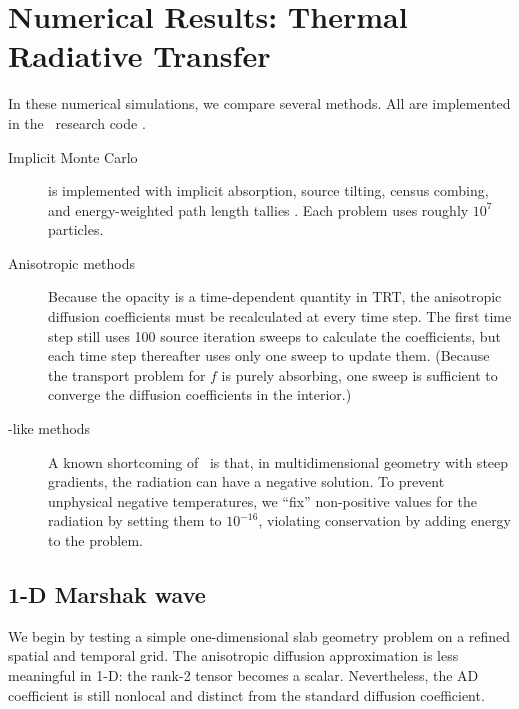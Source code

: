 
\chapter{Numerical Results: Thermal Radiative Transfer}
\label{chap:trtNumericalResults}

In these numerical simulations, we compare several methods. All
are implemented in the \pytrt\ research code \cite{Pytrt}.

\begin{description}

  \item[Implicit Monte Carlo] is implemented  with implicit
    absorption, source tilting, census combing, and
    energy-weighted path length tallies \cite{Urb2006}. Each problem uses
    roughly $10^7$ particles.

  \item[Anisotropic methods] Because the opacity is a time-dependent quantity
in TRT, the anisotropic diffusion coefficients must be recalculated at every
time step. The first time step still uses 100 source iteration sweeps to
calculate the coefficients, but each time step thereafter uses only one sweep to
update them. (Because the transport problem for $f$ is purely absorbing, one
sweep is sufficient to converge the diffusion coefficients in the interior.)

  \item[\Pone-like methods] A known shortcoming of \Pone\ is that, in
    multidimensional geometry with steep gradients, the radiation can have a
    negative solution. To prevent unphysical negative temperatures, we
    ``fix'' non-positive values for the radiation by setting them
    to $10^{-16}$, violating conservation by adding energy to the problem.

\end{description}

\section{1-D Marshak wave}
We begin by testing a simple one-dimensional slab geometry problem on a refined
spatial and temporal grid. The anisotropic diffusion approximation is less
meaningful in 1-D: the rank-2 tensor becomes a scalar. Nevertheless, the AD
coefficient is still nonlocal and distinct from the standard diffusion
coefficient.

